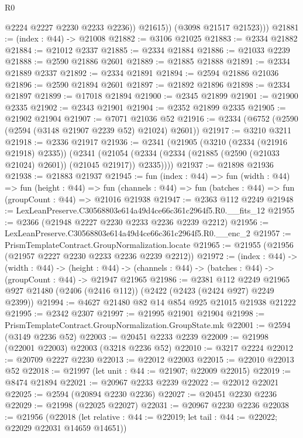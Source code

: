 \begin{lexlean}{R0}
\begin{coremodule}
                @2224
                @2227
                @2230
                @2233
                @2236))
            @21615))
        (@3098 @21517 @21523)))
@21881 := (index : @44) -> @21008
@21882 := @3106 @21025
@21883 := @2334 @21882
@21884 := @21012 @2337
@21885 := @2334 @21884
@21886 := @21033 @2239
@21888 := @2590 @21886 @2601
@21889 := @21885 @21888
@21891 := @2334 @21889 @2337
@21892 := @2334 @21891
@21894 := @2594 @21886 @21036
@21896 := @2590 @21894 @2601
@21897 := @21892 @21896
@21898 := @2334 @21897
@21899 := @17018 @21894
@21900 := @2345 @21899
@21901 := @21900 @2335
@21902 := @2343 @21901
@21904 := @2352 @21899 @2335
@21905 := @21902 @21904
@21907 := @7071 @21036 @52
@21916 := @2334 (@6752 (@2590 (@2594 (@3148 @21907 @2239 @52) @21024) @2601))
@21917 := @3210 @3211
@21918 := @2336 @21917
@21936 := @2341
    (@21905
      (@3210 (@2334 (@21916 @21918) @2335))
      (@2341 (@21054 (@2334 (@2334 (@21885 (@2590 (@21033 @21024) @2601)) (@21045 @21917)) @2335))))
@21937 := @21898 @21936
@21938 := @21883 @21937
@21945 := fun (index : @44) =>
  fun (width : @44) =>
  fun (height : @44) =>
  fun (channels : @44) => fun (batches : @44) => fun (groupCount : @44) => @21016 @21938
@21947 := @2363 @112 @2249
@21948 := LexLeanPreserve.C30568803e614a49d4ce66c361c2964f5.R0.__fits_12
@21955 := @2366 (@21948 @2227 @2230 @2233 @2236 @2239 @2212)
@21956 := LexLeanPreserve.C30568803e614a49d4ce66c361c2964f5.R0.__enc_2
@21957 := PrismTemplateContract.GroupNormalization.locate
@21965 := @21955 (@21956 (@21957 @2227 @2230 @2233 @2236 @2239 @2212))
@21972 := (index : @44) ->
  (width : @44) ->
  (height : @44) -> (channels : @44) -> (batches : @44) -> (groupCount : @44) -> @21947 @21965
@21986 := @2381
    @112
    @2249
    @21965
    @927
    @21480
    (@2406 (@2416 @112))
    (@2422 (@2423 (@2424 @927) @2249 @2399))
@21994 := @4627 @21480 @82 @14 @854 @925 @21015 @21938 @21222
@21995 := @2342 @2307
@21997 := @21995 @21901 @21904
@21998 := PrismTemplateContract.GroupNormalization.GroupState.mk
@22001 := @2594 (@3149 @2236 @52)
@22003 := @20451 @2233 @2239
@22009 := @21998 (@22001 @22003) @22003 (@3218 @2236 @52)
@22010 := @3217 @2224
@22012 := @20709 @2227 @2230
@22013 := @22012 @22003
@22015 := @22010 @22013 @52
@22018 := @21997 (let unit : @44 := @21907; @22009 @22015)
@22019 := @8474 @21894
@22021 := @20967 @2233 @2239
@22022 := @22012 @22021
@22025 := @2594 (@20894 @2230 @2236)
@22027 := @20451 @2230 @2236
@22029 := @21998 (@22025 @22027)
@22031 := @20967 @2230 @2236
@22038 := @21956
    (@22018 (let relative : @44 := @22019; let tail : @44 := @22022; @22029 @22031 @14659 @14651))

\end{coremodule}
\end{lexlean}
